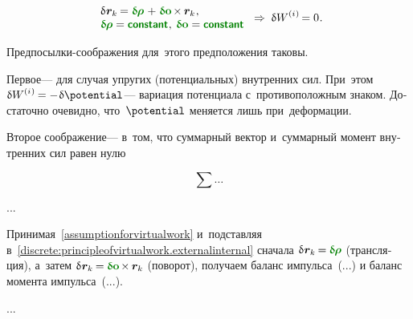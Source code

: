 \begin{otherlanguage}{russian}
\nopagebreak\vspace{-0.2em}\begin{equation}\label{assumptionforvirtualwork}
\begin{array}{l}
\variation{\hspace{.1ex}\locationvector_k} \hspace{-0.16ex}
= \constvarvector{\hspace{-0.1ex}\bm{\rho}} \hspace{.2ex} + \hspace{.12ex} \constvarvector{\bm{o}} \hspace{-0.2ex} \times \hspace{-0.1ex} \locationvector_k
\hspace{.1ex} ,
\\
\constvarvector{\hspace{-0.1ex}\bm{\rho}} = \boldconstant \hspace{.1ex} , \:
\constvarvector{\bm{o}} = \boldconstant
\end{array}
\hspace{.3ex} \Rightarrow \hspace{.6ex}
\variation{\internalwork} \hspace{-0.1ex} = 0 \hspace{.1ex}.
\end{equation}

\vspace{-0.1em} Предпосылки-соображения для~этого предположения таковы.

Первое\:--- для случая упругих (потенциальных) внутренних сил.
При~этом ${\variation{\internalwork} = - \hspace{.16ex} \variation{\potential}}$\:--- вариация потенциала с~противоположным знаком.
Достаточно очевидно, что~$\potential$ меняется лишь при~деформации.

Второе соображение\:--- в~том, что суммарный вектор и~суммарный момент внутренних сил равен нулю

\begin{equation*}
\sum \ldots
\end{equation*}

...

Принимая~\eqref{assumptionforvirtualwork} и~подставляя в~\eqref{discrete:principleofvirtualwork.externalinternal} сначала ${\variation{\hspace{.1ex}\locationvector_k} \hspace{-0.16ex} = \hspace{-0.08ex} \constvarvector{\hspace{-0.1ex}\bm{\rho}}}$ (трансляция), а~затем ${\variation{\hspace{.1ex}\locationvector_k} \hspace{-0.16ex} = \hspace{-0.08ex} \constvarvector{\bm{o}} \hspace{-0.2ex} \times \hspace{-0.1ex} \locationvector_k}$ (поворот), получаем баланс импульса~(...) и баланс момента импульса~(...).

...



\end{otherlanguage}

